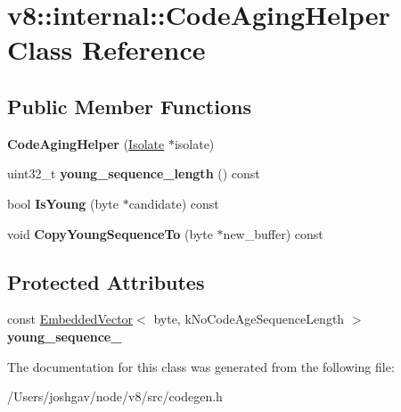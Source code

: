 \hypertarget{classv8_1_1internal_1_1_code_aging_helper}{}\section{v8\+:\+:internal\+:\+:Code\+Aging\+Helper Class Reference}
\label{classv8_1_1internal_1_1_code_aging_helper}
\subsection*{Public Member Functions}
\begin{DoxyCompactItemize}
\item 
{\bfseries Code\+Aging\+Helper} (\hyperlink{classv8_1_1internal_1_1_isolate}{Isolate} $\ast$isolate)\hypertarget{classv8_1_1internal_1_1_code_aging_helper_aef8b704c105443ed1dab6fd09ae0d8ad}{}\label{classv8_1_1internal_1_1_code_aging_helper_aef8b704c105443ed1dab6fd09ae0d8ad}

\item 
uint32\+\_\+t {\bfseries young\+\_\+sequence\+\_\+length} () const \hypertarget{classv8_1_1internal_1_1_code_aging_helper_a22f4324a74141eb95ca45caf83c30133}{}\label{classv8_1_1internal_1_1_code_aging_helper_a22f4324a74141eb95ca45caf83c30133}

\item 
bool {\bfseries Is\+Young} (byte $\ast$candidate) const \hypertarget{classv8_1_1internal_1_1_code_aging_helper_aed9d12b1e54be66604ccadade0728c9f}{}\label{classv8_1_1internal_1_1_code_aging_helper_aed9d12b1e54be66604ccadade0728c9f}

\item 
void {\bfseries Copy\+Young\+Sequence\+To} (byte $\ast$new\+\_\+buffer) const \hypertarget{classv8_1_1internal_1_1_code_aging_helper_af6fb5448eebff54dcdeabe36752e900e}{}\label{classv8_1_1internal_1_1_code_aging_helper_af6fb5448eebff54dcdeabe36752e900e}

\end{DoxyCompactItemize}
\subsection*{Protected Attributes}
\begin{DoxyCompactItemize}
\item 
const \hyperlink{classv8_1_1internal_1_1_embedded_vector}{Embedded\+Vector}$<$ byte, k\+No\+Code\+Age\+Sequence\+Length $>$ {\bfseries young\+\_\+sequence\+\_\+}\hypertarget{classv8_1_1internal_1_1_code_aging_helper_a3b3c8139df06ad8b2849de74b05f5497}{}\label{classv8_1_1internal_1_1_code_aging_helper_a3b3c8139df06ad8b2849de74b05f5497}

\end{DoxyCompactItemize}


The documentation for this class was generated from the following file\+:\begin{DoxyCompactItemize}
\item 
/\+Users/joshgav/node/v8/src/codegen.\+h\end{DoxyCompactItemize}
